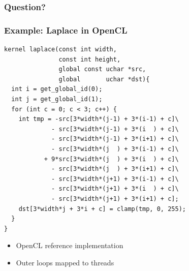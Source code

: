 \documentclass{beamer}
\begin{document}
\appendix

\setcounter{finalframe}{\value{framenumber}}

\begin{frame}
  \frametitle{Question?}
\end{frame}



\begin{frame}[fragile]
  \frametitle{Example: Laplace in OpenCL}
\tiny
\lstset{style=CL}
\begin{lstlisting}
kernel laplace(const int width,
               const int height,
               global const uchar *src,
               global       uchar *dst){
  int i = get_global_id(0);
  int j = get_global_id(1);
  for (int c = 0; c < 3; c++) {
    int tmp = -src[3*width*(j-1) + 3*(i-1) + c]\
             - src[3*width*(j-1) + 3*(i  ) + c]\
             - src[3*width*(j-1) + 3*(i+1) + c]\
             - src[3*width*(j  ) + 3*(i-1) + c]\
           + 9*src[3*width*(j  ) + 3*(i  ) + c]\
             - src[3*width*(j  ) + 3*(i+1) + c]\
             - src[3*width*(j+1) + 3*(i-1) + c]\
             - src[3*width*(j+1) + 3*(i  ) + c]\
             - src[3*width*(j+1) + 3*(i+1) + c];
    dst[3*width*j + 3*i + c] = clamp(tmp, 0, 255);
  }
}
\end{lstlisting}
\begin{itemize}
\item OpenCL reference implementation
\item Outer loops mapped to threads
\end{itemize}
\end{frame}
\end{document}
